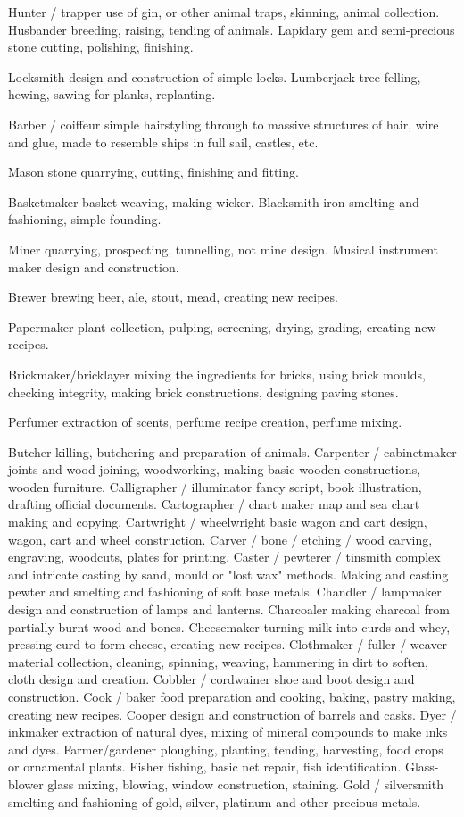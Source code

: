 \documentclass[a4paper]{article}
\begin{document}
\begin{multicols}{3}
Hunter / trapper use of gin, or other animal traps,
skinning, animal collection.
Husbander breeding, raising, tending of animals.
Lapidary gem and semi-precious stone cutting,
polishing, finishing.

Locksmith design and construction of simple
locks.
Lumberjack tree felling, hewing, sawing for
planks, replanting.

Barber / coiffeur simple hairstyling through to
massive structures of hair, wire and glue, made to
resemble ships in full sail, castles, etc.

Mason stone quarrying, cutting, finishing and
fitting.

Basketmaker basket weaving, making wicker.
Blacksmith iron smelting and fashioning, simple
founding.

Miner quarrying, prospecting, tunnelling, not mine
design. Musical instrument maker design and construction.

Brewer brewing beer, ale, stout, mead, creating
new recipes.

Papermaker plant collection, pulping, screening,
drying, grading, creating new recipes.

Brickmaker/bricklayer mixing the ingredients for
bricks, using brick moulds, checking integrity,
making brick constructions, designing paving
stones.

Perfumer extraction of scents, perfume recipe
creation, perfume mixing.

Butcher killing, butchering and preparation of
animals.
Carpenter / cabinetmaker joints and wood-joining,
woodworking, making basic wooden constructions,
wooden furniture.
Calligrapher / illuminator fancy script, book
illustration, drafting official documents.
Cartographer / chart maker map and sea chart
making and copying.
Cartwright / wheelwright basic wagon and cart
design, wagon, cart and wheel construction.
Carver / bone / etching / wood carving, engraving, woodcuts, plates for printing.
Caster / pewterer / tinsmith complex and intricate casting by sand, mould or "lost wax" methods.
Making and casting pewter and smelting and fashioning of soft base metals.
Chandler / lampmaker design and construction of
lamps and lanterns.
Charcoaler making charcoal from partially burnt
wood and bones.
Cheesemaker turning milk into curds and whey,
pressing curd to form cheese, creating new recipes.
Clothmaker / fuller / weaver material collection,
cleaning, spinning, weaving, hammering in dirt to
soften, cloth design and creation.
Cobbler / cordwainer shoe and boot design and
construction.
Cook / baker food preparation and cooking, baking, pastry making, creating new recipes.
Cooper design and construction of barrels and
casks.
Dyer / inkmaker extraction of natural dyes, mixing
of mineral compounds to make inks and dyes.
Farmer/gardener ploughing, planting, tending,
harvesting, food crops or ornamental plants.
Fisher fishing, basic net repair, fish identification.
Glass-blower glass mixing, blowing, window
construction, staining.
Gold / silversmith smelting and fashioning of
gold, silver, platinum and other precious metals.


\end{multicols}
\end{document}
